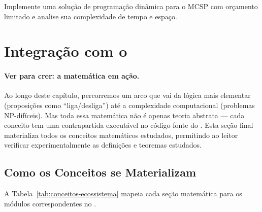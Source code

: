 \begin{exercicio}
    Implemente uma solução de programação dinâmica para o MCSP com
    orçamento limitado e analise sua complexidade de tempo e espaço.
\end{exercicio}

\section{Integração com o \opencodeeco{}}
\label{sec:integracao}
\nivelbasico

\paragraph{Ver para crer: a matemática em ação.} Ao longo deste capítulo,
percorremos um arco que vai da lógica mais elementar (proposições como
``liga/desliga'') até a complexidade computacional (problemas NP-difíceis).
Mas toda essa matemática não é apenas teoria abstrata --- cada conceito
tem uma contrapartida executável no código-fonte do \opencodeeco{}. Esta
seção final materializa todos os conceitos matemáticos estudados, permitindo
ao leitor verificar experimentalmente as definições e teoremas estudados.

\subsection{Como os Conceitos se Materializam}

A Tabela~\ref{tab:conceitos-ecossistema} mapeia cada seção matemática para
os módulos correspondentes no \opencodeeco{}.

